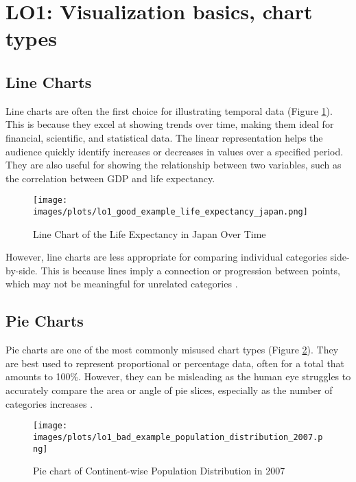 \section{LO1: Visualization basics, chart types}

\subsection{Line Charts}

Line charts are often the first choice for illustrating temporal data (Figure \ref{fig:line_chart_good}). This is because they excel at showing trends over time, making them ideal for financial, scientific, and statistical data. The linear representation helps the audience quickly identify increases or decreases in values over a specified period. They are also useful for showing the relationship between two variables, such as the correlation between GDP and life expectancy.

\begin{figure}[h]
    \centering
    \texttt{[image: images/plots/lo1\_good\_example\_life\_expectancy\_japan.png]} 
    \caption{Line Chart of the Life Expectancy in Japan Over Time}
    \label{fig:line_chart_good}
\end{figure}

However, line charts are less appropriate for comparing individual categories side-by-side. This is because lines imply a connection or progression between points, which may not be meaningful for unrelated categories \cite{fewNowYouSee2009}.

\subsection{Pie Charts}

Pie charts are one of the most commonly misused chart types (Figure \ref{fig:pie_chart_bad}). They are best used to represent proportional or percentage data, often for a total that amounts to 100\%. However, they can be misleading as the human eye struggles to accurately compare the area or angle of pie slices, especially as the number of categories increases \cite{tufteVisualDisplayQuantitative2015}.

\begin{figure}[h]
    \centering
    \texttt{[image: images/plots/lo1\_bad\_example\_population\_distribution\_2007.png]} 
    \caption{Pie chart of Continent-wise Population Distribution in 2007}
    \label{fig:pie_chart_bad}
\end{figure}

